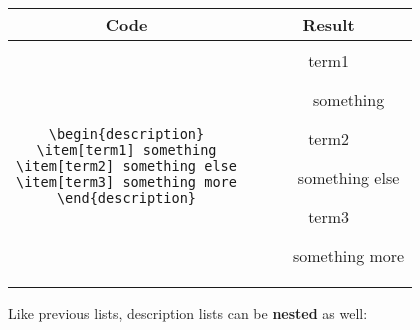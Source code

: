 \begin{center}
\begin{tabular}{cc}

Code & Result\\
\hline\\

\parbox{6cm}{
	\texttt{\textbackslash begin\{description\}\\
	\textbackslash item[term1]  something\\
	\textbackslash item[term2]  something else\\
	\textbackslash item[term3]  something more\\
	\textbackslash end\{description\}\\
	}
} 

&

\parbox{4cm}{
	\begin{description}
	\item[term1] something
	\item[term2] something else
	\item[term3] something more
	\end{description}
}

\end{tabular}
\end{center}


Like previous lists, description lists can be \textbf{nested} as well:\\

